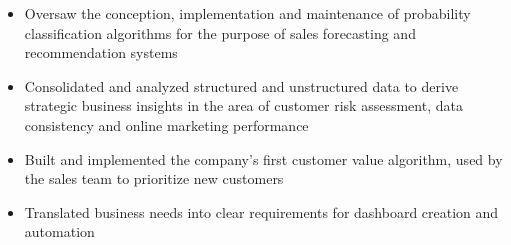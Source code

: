 \documentclass[10pt,a4paper,ragged2e,withhyper]{altacv}
\begin{document}
\begin{paracol}{2}
\begin{itemize}
\end{itemize}

\divider

\begin{itemize}

\item Oversaw the conception, implementation and maintenance of probability classification algorithms for the purpose of sales forecasting and recommendation systems

\item Consolidated and analyzed  structured and unstructured data to derive strategic business insights in the area of customer risk assessment, data consistency and online marketing performance

\item Built and implemented the company's first customer value algorithm, used by the sales team to prioritize new customers

\item Translated business needs into clear requirements for dashboard creation and automation  

\end{itemize}

\newpage


%



\switchcolumn







\end{paracol}
\end{document}
